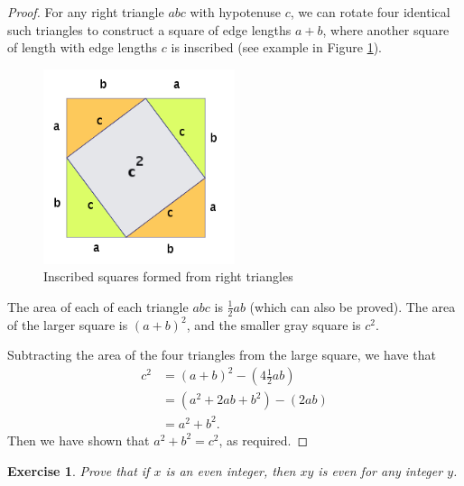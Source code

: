 \documentclass{article}[12pt]
\newtheorem{exercise}{Exercise}[section]
\begin{document}
        \begin{proof}
            
            For any right triangle $abc$ with hypotenuse $c$, we can rotate four identical such triangles to construct a square of edge lengths $a + b$, where another square of length with edge lengths $c$ is inscribed (see example in Figure \ref{tab:pythagoras}).
            \begin{figure}[!ht]
                \centering
                \includegraphics[width=0.5\textwidth]{attachments/1.1-pythagoras.png}
                \caption{Inscribed squares formed from right triangles}
                \label{tab:pythagoras}
            \end{figure}
            
            The area of each of each triangle $abc$ is $\frac{1}{2}ab$ (which can also be proved). The area of the larger square is $(a + b)^2$, and the smaller gray square is $c^2$.
            
            Subtracting the area of the four triangles from the large square, we have that
            \begin{align}
                c^2
                &= (a + b)^2 - \left(4 \frac{1}{2}ab \right)
                \\
                &= (a^2 + 2ab + b^2) - \left(2ab\right)
                \\
                &= a^2 + b^2.
            \end{align}
            Then we have shown that $a^2 + b^2 = c^2$, as required.
        \end{proof}
    
        \begin{exercise}\label{prop:even-prod}
            Prove that if $x$ is an even integer, then $x y$ is even for any integer $y$.
        \end{exercise}
        
\end{document}
